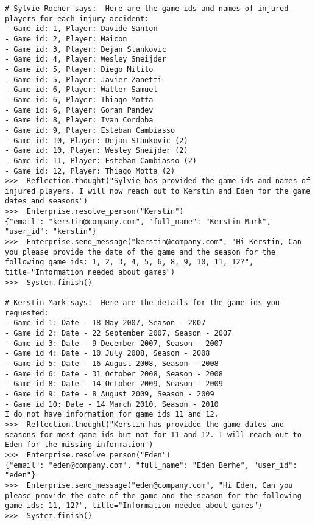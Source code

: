\begin{lstlisting}
# Sylvie Rocher says:  Here are the game ids and names of injured players for each injury accident:
- Game id: 1, Player: Davide Santon
- Game id: 2, Player: Maicon
- Game id: 3, Player: Dejan Stankovic
- Game id: 4, Player: Wesley Sneijder
- Game id: 5, Player: Diego Milito
- Game id: 5, Player: Javier Zanetti
- Game id: 6, Player: Walter Samuel
- Game id: 6, Player: Thiago Motta
- Game id: 6, Player: Goran Pandev
- Game id: 8, Player: Ivan Cordoba
- Game id: 9, Player: Esteban Cambiasso
- Game id: 10, Player: Dejan Stankovic (2)
- Game id: 10, Player: Wesley Sneijder (2)
- Game id: 11, Player: Esteban Cambiasso (2)
- Game id: 12, Player: Thiago Motta (2) 
>>>  Reflection.thought("Sylvie has provided the game ids and names of injured players. I will now reach out to Kerstin and Eden for the game dates and seasons")
>>>  Enterprise.resolve_person("Kerstin")
{"email": "kerstin@company.com", "full_name": "Kerstin Mark", "user_id": "kerstin"}
>>>  Enterprise.send_message("kerstin@company.com", "Hi Kerstin, Can you please provide the date of the game and the season for the following game ids: 1, 2, 3, 4, 5, 6, 8, 9, 10, 11, 12?", title="Information needed about games")
>>>  System.finish()

# Kerstin Mark says:  Here are the details for the game ids you requested:
- Game id 1: Date - 18 May 2007, Season - 2007
- Game id 2: Date - 22 September 2007, Season - 2007
- Game id 3: Date - 9 December 2007, Season - 2007
- Game id 4: Date - 10 July 2008, Season - 2008
- Game id 5: Date - 16 August 2008, Season - 2008
- Game id 6: Date - 31 October 2008, Season - 2008
- Game id 8: Date - 14 October 2009, Season - 2009
- Game id 9: Date - 8 August 2009, Season - 2009
- Game id 10: Date - 14 March 2010, Season - 2010
I do not have information for game ids 11 and 12. 
>>>  Reflection.thought("Kerstin has provided the game dates and seasons for most game ids but not for 11 and 12. I will reach out to Eden for the missing information")
>>>  Enterprise.resolve_person("Eden")
{"email": "eden@company.com", "full_name": "Eden Berhe", "user_id": "eden"}
>>>  Enterprise.send_message("eden@company.com", "Hi Eden, Can you please provide the date of the game and the season for the following game ids: 11, 12?", title="Information needed about games")
>>>  System.finish()


\end{lstlisting}
